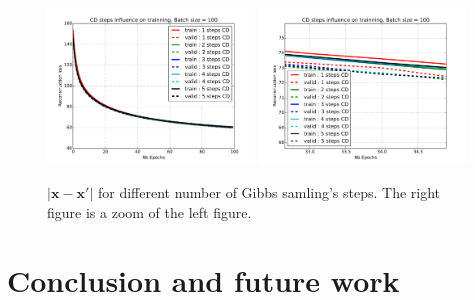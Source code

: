 \documentclass{article}
\begin{document}
\begin{figure}
\centering
\includegraphics[width=0.49\textwidth]{CD}
\includegraphics[width=0.49\textwidth]{CD_zoom}
\label{CD}
\caption{$\lvert \mathbf{x} - \mathbf{x'} \rvert$ for different number of Gibbs samling's steps. The right figure is a zoom of the left figure.}
\end{figure}



\clearpage
\section{Conclusion and future work}



\clearpage
\nocite{*}


\end{document}
